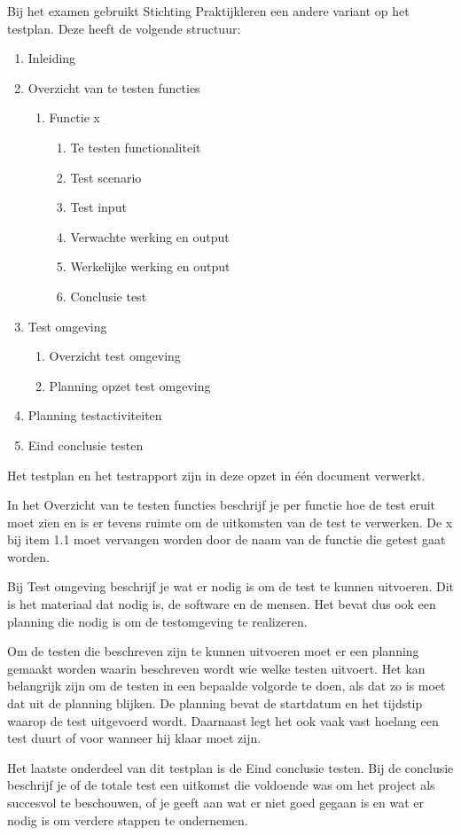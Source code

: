 
\renewcommand{\labelenumii}{\theenumii}
\renewcommand{\theenumii}{\theenumi.\arabic{enumii}.}
\renewcommand{\theenumiii}{\theenumii\arabic{enumiii}}

Bij het examen gebruikt Stichting Praktijkleren een andere variant op het testplan. Deze heeft de volgende structuur:
\begin{enumerate}
\item Inleiding
\item Overzicht van te testen functies
	\begin{enumerate}
	\item Functie x
		\begin{enumerate}
		\item Te testen functionaliteit
		\item Test scenario
		\item Test input
		\item Verwachte werking en output
		\item Werkelijke werking en output
		\item Conclusie test
		\end{enumerate}
	\end{enumerate}
\item Test omgeving
	\begin{enumerate}
	\item Overzicht test omgeving
	\item Planning opzet test omgeving
	\end{enumerate}
\item Planning testactiviteiten
\item Eind conclusie testen
\end{enumerate}

Het testplan en het testrapport zijn in deze opzet in \'e\'en document verwerkt.

In het Overzicht van te testen functies beschrijf je per functie hoe de test eruit moet zien en is er tevens ruimte om de uitkomsten van de test te verwerken. De x bij item 1.1 moet vervangen worden door de naam van de functie die getest gaat worden.

Bij Test omgeving beschrijf je wat er nodig is om de test te kunnen uitvoeren. Dit is het materiaal dat nodig is, de software en de mensen. Het bevat dus ook een planning die nodig is om de testomgeving te realizeren.

Om de testen die beschreven zijn te kunnen uitvoeren moet er een planning gemaakt worden waarin beschreven wordt wie welke testen uitvoert. Het kan belangrijk zijn om de testen in een bepaalde volgorde te doen, als dat zo is moet dat uit de planning blijken. De planning bevat de startdatum en het tijdstip waarop de test uitgevoerd wordt. Daarnaast legt het ook vaak vast hoelang een test duurt of voor wanneer hij klaar moet zijn.

Het laatste onderdeel van dit testplan is de Eind conclusie testen. Bij de conclusie beschrijf je of de totale test een uitkomst die voldoende was om het project als succesvol te beschouwen, of je geeft aan wat er niet goed gegaan is en wat er nodig is om verdere stappen te ondernemen.


